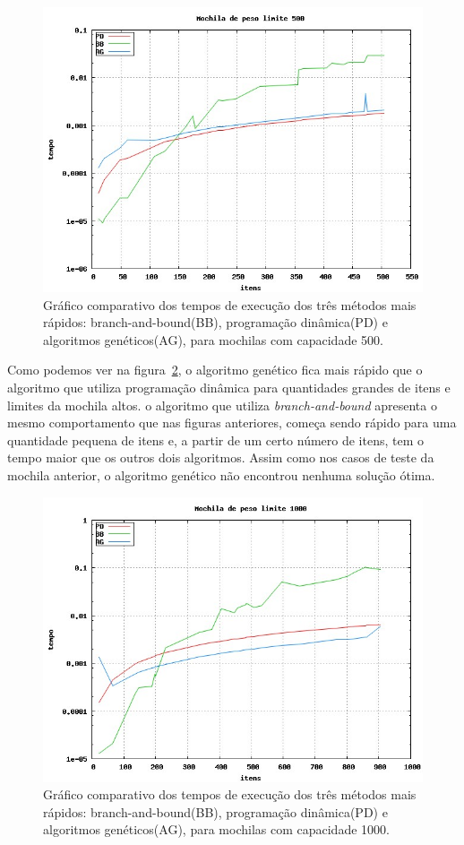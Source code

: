 \begin{figure}[htp]
	\centering
	\includegraphics[scale=0.4]{images/w500.jpg}
	\caption{Gráfico comparativo dos tempos de execução dos três métodos mais rápidos: branch-and-bound(BB), programação dinâmica(PD) e algoritmos genéticos(AG), para mochilas com capacidade 500.}
	\label{fig:w500}
\end{figure}

Como podemos ver na figura~\ref{fig:w1000}, o algoritmo genético fica mais rápido que o algoritmo que utiliza programação dinâmica para quantidades grandes de itens e limites da mochila altos. o algoritmo que utiliza \textit{branch-and-bound} apresenta o mesmo comportamento que nas figuras anteriores, começa sendo rápido para uma quantidade pequena de itens e, a partir de um certo número de itens, tem o tempo maior que os outros dois algoritmos. Assim como nos casos de teste da mochila anterior, o algoritmo genético não encontrou nenhuma solução ótima.

\begin{figure}[htp]
	\centering
	\includegraphics[scale=0.4]{images/w1000.jpg}
	\caption{Gráfico comparativo dos tempos de execução dos três métodos mais rápidos: branch-and-bound(BB), programação dinâmica(PD) e algoritmos genéticos(AG), para mochilas com capacidade 1000.}
	\label{fig:w1000}
\end{figure}

